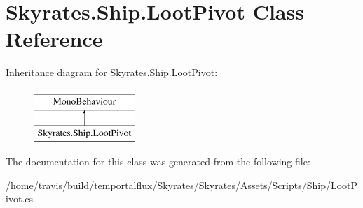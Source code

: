\hypertarget{class_skyrates_1_1_ship_1_1_loot_pivot}{\section{Skyrates.\-Ship.\-Loot\-Pivot Class Reference}
\label{class_skyrates_1_1_ship_1_1_loot_pivot}
}
Inheritance diagram for Skyrates.\-Ship.\-Loot\-Pivot\-:\begin{figure}[H]
\begin{center}
\leavevmode
\includegraphics[height=2.000000cm]{class_skyrates_1_1_ship_1_1_loot_pivot}
\end{center}
\end{figure}


The documentation for this class was generated from the following file\-:\begin{DoxyCompactItemize}
\item 
/home/travis/build/temportalflux/\-Skyrates/\-Skyrates/\-Assets/\-Scripts/\-Ship/Loot\-Pivot.\-cs\end{DoxyCompactItemize}
